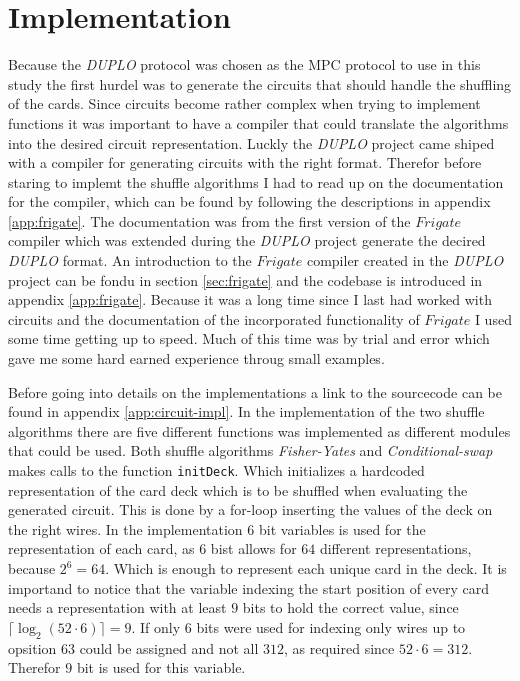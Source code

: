 \documentclass[twoside,11pt,openright]{report}
\newcommand{\FY}{\textit{Fisher-Yates} }
\newcommand{\CS}{\textit{Conditional-swap} }
\newcommand{\DUPLO}{\textit{DUPLO} }
\begin{document}
\section{Implementation}
\label{sec:cir_imp}
Because the \DUPLO protocol was chosen as the MPC protocol to use in this study the first hurdel was to generate the circuits that should handle the shuffling of the cards. Since circuits become rather complex when trying to implement functions it was important to have a compiler that could translate the algorithms into the desired circuit representation. Luckly the \DUPLO project came shiped with a compiler for generating circuits with the right format. Therefor before staring to implemt the shuffle algorithms I had to read up on the documentation for the compiler, which can be found by following the descriptions in appendix \ref{app:frigate}. The documentation was from the first version of the $Frigate$ compiler which was extended during the \DUPLO project generate the decired \DUPLO format. An introduction to the $Frigate$ compiler created in the \DUPLO project can be fondu in section \ref{sec:frigate} and the codebase is introduced in appendix \ref{app:frigate}. Because it was a long time since I last had worked with circuits and the documentation of the incorporated functionality of $Frigate$ I used some time getting up to speed. Much of this time was by trial and error which gave me some hard earned experience throug small examples.

\bigskip

Before going into details on the implementations a link to the sourcecode can be found in appendix \ref{app:circuit-impl}. In the implementation of the two shuffle algorithms there are five different functions was implemented as different modules that could be used. Both shuffle algorithms \FY and \CS makes calls to the function \verb|initDeck|. Which initializes a hardcoded representation of the card deck which is to be shuffled when evaluating the generated circuit. This is done by a for-loop inserting the values of the deck on the right wires. In the implementation $6$ bit variables is used for the representation of each card, as $6$ bist allows for $64$ different representations, because $2^6=64$. Which is enough to represent each unique card in the deck. It is importand to notice that the variable indexing the start position of every card needs a representation with at least $9$ bits to hold the correct value, since $\lceil \log_2(52\cdot 6)\rceil=9$. If only $6$ bits were used for indexing only wires up to opsition $63$ could be assigned and not all $312$, as required since $52\cdot 6=312$. Therefor $9$ bit is used for this variable.
\end{document}
